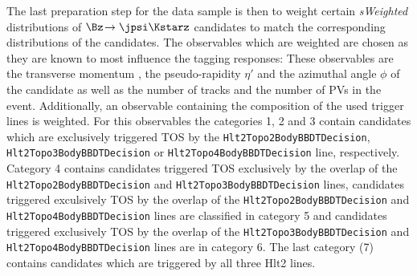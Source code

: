 The last preparation step for the data sample is then to weight certain \emph{sWeighted} distributions of $\Bz\!\to\jpsi\Kstarz$ candidates to match the corresponding distributions of the \BdToDpi candidates.
The observables which are weighted are chosen as they are known to most influence the tagging responses:
These observables are the transverse momentum \pt, the pseudo-rapidity $\eta'$ and the azimuthal angle $\phi$ of the \Bz candidate as well as the number of tracks and the number of \ac{PV}s in the event.
Additionally, an observable containing the composition of the used trigger lines is weighted.
For this observables the categories \num{1}, \num{2} and \num{3} contain candidates which are exclusively triggered TOS by the \verb!Hlt2Topo2BodyBBDTDecision!, \verb!Hlt2Topo3BodyBBDTDecision! or \verb!Hlt2Topo4BodyBBDTDecision! line, respectively.
Category \num{4} contains candidates triggered TOS exclusively by the overlap of the \verb!Hlt2Topo2BodyBBDTDecision! and \verb!Hlt2Topo3BodyBBDTDecision! lines, candidates triggered exculsively TOS by the overlap of the \verb!Hlt2Topo2BodyBBDTDecision! and \verb!Hlt2Topo4BodyBBDTDecision! lines are classified in category \num{5} and candidates triggered exclusively TOS by the overlap of the \verb!Hlt2Topo3BodyBBDTDecision! and \verb!Hlt2Topo4BodyBBDTDecision! lines are in category \num{6}.
The last category (\num{7}) contains candidates which are triggered by all three Hlt2 lines.

